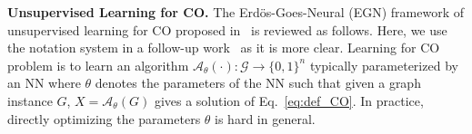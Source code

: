 \textbf{Unsupervised Learning for CO.} The Erd\"{o}s-Goes-Neural (EGN) framework of unsupervised learning for CO proposed in~\citep{karalias2020erdos} is reviewed as follows. Here, we use the notation system in a follow-up work~\citep{wang2022unsupervised} as it is more clear. Learning for CO problem is to learn an algorithm $\mathcal{A}_{\theta}(\cdot):\mathcal{G}\rightarrow \{0,1\}^n$ typically parameterized by an NN where $\theta$ denotes the parameters of the NN such that given a graph instance $G$, $X=\mathcal{A}_{\theta}(G)$ gives a solution of Eq.~\ref{eq:def_CO}. %
In practice, directly optimizing the parameters $\theta$ is hard in general. 

